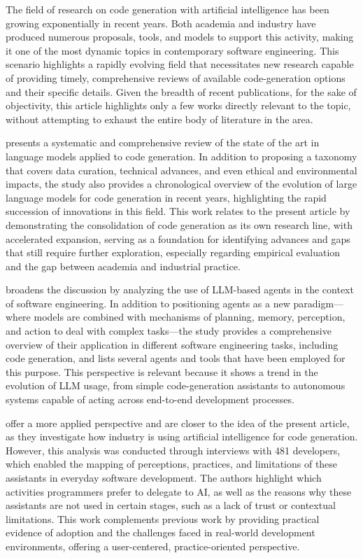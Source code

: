 The field of research on code generation with artificial intelligence has been growing exponentially in recent years. Both academia and industry have produced numerous proposals, tools, and models to support this activity, making it one of the most dynamic topics in contemporary software engineering. This scenario highlights a rapidly evolving field that necessitates new research capable of providing timely, comprehensive reviews of available code-generation options and their specific details. Given the breadth of recent publications, for the sake of objectivity, this article highlights only a few works directly relevant to the topic, without attempting to exhaust the entire body of literature in the area.

\cite{jiang2024survey} presents a systematic and comprehensive review of the state of the art in language models applied to code generation. In addition to proposing a taxonomy that covers data curation, technical advances, and even ethical and environmental impacts, the study also provides a chronological overview of the evolution of large language models for code generation in recent years, highlighting the rapid succession of innovations in this field. This work relates to the present article by demonstrating the consolidation of code generation as its own research line, with accelerated expansion, serving as a foundation for identifying advances and gaps that still require further exploration, especially regarding empirical evaluation and the gap between academia and industrial practice.

\cite{liu2024large} broadens the discussion by analyzing the use of LLM-based agents in the context of software engineering. In addition to positioning agents as a new paradigm—where models are combined with mechanisms of planning, memory, perception, and action to deal with complex tasks—the study provides a comprehensive overview of their application in different software engineering tasks, including code generation, and lists several agents and tools that have been employed for this purpose. This perspective is relevant because it shows a trend in the evolution of LLM usage, from simple code-generation assistants to autonomous systems capable of acting across end-to-end development processes.

\cite{sergeyuk2025using} offer a more applied perspective and are closer to the idea of the present article, as they investigate how industry is using artificial intelligence for code generation. However, this analysis was conducted through interviews with 481 developers, which enabled the mapping of perceptions, practices, and limitations of these assistants in everyday software development. The authors highlight which activities programmers prefer to delegate to AI, as well as the reasons why these assistants are not used in certain stages, such as a lack of trust or contextual limitations. This work complements previous work by providing practical evidence of adoption and the challenges faced in real-world development environments, offering a user-centered, practice-oriented perspective.

